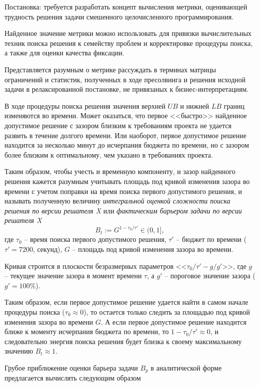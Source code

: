 \documentclass[%
	11pt,
	a4paper,
	utf8,
		]{article}
\begin{document}
Постановка: требуется разработать концепт вычисления метрики, оценивающей трудность решения задачи смешенного целочисленного программирования. 

Найденное значение метрики можно использовать для привязки вычислительных техник поиска решения к семейству проблем и корректировке процедуры поиска, а также для оценки качества фиксации.

Представляется разумным о метрике рассуждать в терминах матрицы ограничений и статистик, полученных в ходе пресолвинга и решения исходной задачи в релаксированной постановке, не привязаных к бизнес-интерпретациям. 

В ходе процедуры поиска решения значения верхней $ UB $ и нижней $ LB $ границ изменяются во времени. Может оказаться, что первое <<быстро>> найденное допустимое решение с зазором близким к требованиям проекта не удается развить в течение долгого времени. Или наоборот, первое допустимое решение находится за несколько минут до исчерпания бюджета по времени, но с зазором более близким к оптимальному, чем указано в требованиях проекта.

Таким образом, чтобы учесть и временн\emph{у}ю компоненту, и зазор найденного решения кажется разумным учитывать площадь под кривой изменения зазора во времени с учетом поправки на время поиска первого допустимого решения, и называть полученную величину \emph{интегральной оценкой сложности поиска решения по версии решателя X} или \emph{фактическим барьером задачи по версии решателя X}
$$
B_t := G^{ 1 - \tau_0 / \tau' } \in (0, 1],
$$
где $ \tau_0 $ -- время поиска первого допустимого решения, $ \tau' $ -- бюджет по времени ($ \tau' = 7200 $, секунд), $ G $ -- площадь под кривой изменения зазора во времени.

Кривая строится в плоскости безразмерных параметров <<$  \tau_0 / \tau' - g / g'$>>, где $ g $ -- текущее значение зазора в момент времени $ \tau $, а $ g' $ -- пороговое значение зазора ($ g' = 100\% $). 

Таким образом, если первое допустимое решение удается найти в самом начале процедуры поиска ($ \tau_0 \approx 0 $), то остается только следить за площадью под кривой изменения зазора во времени $ G $. А если первое допустимое решение находится ближе к моменту исчерпания бюджета по времени, то $ 1 - \tau_0 / \tau' \approx 0 $, и следовательно энергия поиска решения будет близка к своему максимальному значению $ B_t \approx 1 $.

Грубое приближение оценки барьера задачи $ B_p $ в аналитической форме предлагается вычислять следующим образом
\end{document}
